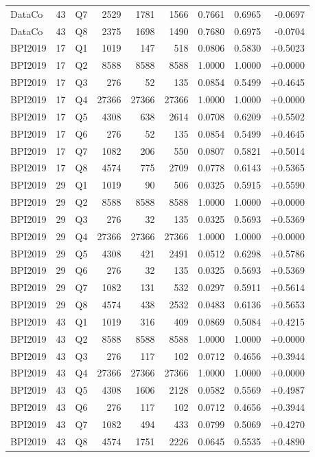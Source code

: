 \documentclass[11pt,letterpaper]{article}
\begin{document}
\begin{longtable}{lrlrrrrrr}
DataCo & 43 & Q7 & 2529 & 1781 & 1566 & 0.7661 & 0.6965 & -0.0697\\
DataCo & 43 & Q8 & 2375 & 1698 & 1490 & 0.7680 & 0.6975 & -0.0704\\
BPI2019 & 17 & Q1 & 1019 & 147 & 518 & 0.0806 & 0.5830 & +0.5023\\
BPI2019 & 17 & Q2 & 8588 & 8588 & 8588 & 1.0000 & 1.0000 & +0.0000\\
BPI2019 & 17 & Q3 & 276 & 52 & 135 & 0.0854 & 0.5499 & +0.4645\\
BPI2019 & 17 & Q4 & 27366 & 27366 & 27366 & 1.0000 & 1.0000 & +0.0000\\
BPI2019 & 17 & Q5 & 4308 & 638 & 2614 & 0.0708 & 0.6209 & +0.5502\\
BPI2019 & 17 & Q6 & 276 & 52 & 135 & 0.0854 & 0.5499 & +0.4645\\
BPI2019 & 17 & Q7 & 1082 & 206 & 550 & 0.0807 & 0.5821 & +0.5014\\
BPI2019 & 17 & Q8 & 4574 & 775 & 2709 & 0.0778 & 0.6143 & +0.5365\\
BPI2019 & 29 & Q1 & 1019 & 90 & 506 & 0.0325 & 0.5915 & +0.5590\\
BPI2019 & 29 & Q2 & 8588 & 8588 & 8588 & 1.0000 & 1.0000 & +0.0000\\
BPI2019 & 29 & Q3 & 276 & 32 & 135 & 0.0325 & 0.5693 & +0.5369\\
BPI2019 & 29 & Q4 & 27366 & 27366 & 27366 & 1.0000 & 1.0000 & +0.0000\\
BPI2019 & 29 & Q5 & 4308 & 421 & 2491 & 0.0512 & 0.6298 & +0.5786\\
BPI2019 & 29 & Q6 & 276 & 32 & 135 & 0.0325 & 0.5693 & +0.5369\\
BPI2019 & 29 & Q7 & 1082 & 131 & 532 & 0.0297 & 0.5911 & +0.5614\\
BPI2019 & 29 & Q8 & 4574 & 438 & 2532 & 0.0483 & 0.6136 & +0.5653\\
BPI2019 & 43 & Q1 & 1019 & 316 & 409 & 0.0869 & 0.5084 & +0.4215\\
BPI2019 & 43 & Q2 & 8588 & 8588 & 8588 & 1.0000 & 1.0000 & +0.0000\\
BPI2019 & 43 & Q3 & 276 & 117 & 102 & 0.0712 & 0.4656 & +0.3944\\
BPI2019 & 43 & Q4 & 27366 & 27366 & 27366 & 1.0000 & 1.0000 & +0.0000\\
BPI2019 & 43 & Q5 & 4308 & 1606 & 2128 & 0.0582 & 0.5569 & +0.4987\\
BPI2019 & 43 & Q6 & 276 & 117 & 102 & 0.0712 & 0.4656 & +0.3944\\
BPI2019 & 43 & Q7 & 1082 & 494 & 433 & 0.0799 & 0.5069 & +0.4270\\
BPI2019 & 43 & Q8 & 4574 & 1751 & 2226 & 0.0645 & 0.5535 & +0.4890\\
\end{longtable}\normalsize
\end{document}
